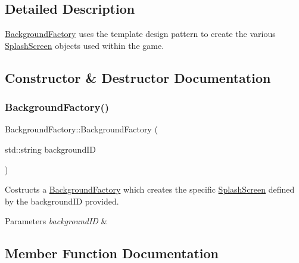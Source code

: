 \subsection{Detailed Description}
\hyperlink{class_background_factory}{Background\+Factory} uses the template design pattern to create the various \hyperlink{class_splash_screen}{Splash\+Screen} objects used within the game. 

\subsection{Constructor \& Destructor Documentation}
\mbox{\label{class_background_factory_a002c292a123aaf3f47f7c70a0abf9406}} 
\subsubsection{\texorpdfstring{Background\+Factory()}{BackgroundFactory()}}
{\footnotesize\ttfamily Background\+Factory\+::\+Background\+Factory (\begin{DoxyParamCaption}\item[{std\+::string}]{background\+ID }\end{DoxyParamCaption})\hspace{0.3cm}{\ttfamily [inline]}}



Costructs a \hyperlink{class_background_factory}{Background\+Factory} which creates the specific \hyperlink{class_splash_screen}{Splash\+Screen} defined by the background\+ID provided. 


\begin{DoxyParams}{Parameters}
{\em background\+ID} & \\
\hline
\end{DoxyParams}


\subsection{Member Function Documentation}
\mbox{\label{class_background_factory_a17793b3ec704137388b70f53361691c3}} 
